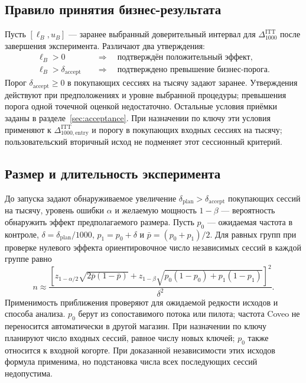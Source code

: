 \documentclass[12pt,a4paper]{article}
\theoremstyle{plainru}
\begin{document}
\subsection{Правило принятия бизнес-результата}\label{sec:eval-acceptance}

Пусть $[\ell_B,u_B]$ --- заранее выбранный доверительный интервал
для $\Delta_{1000}^{\mathrm{ITT}}$ после завершения эксперимента.
Различают два утверждения:
\begin{align}
 \ell_B>0
 &\quad\Longrightarrow\quad
 \text{подтверждён положительный эффект},
 \label{eq:eval-positive-acceptance}\\
 \ell_B>\delta_{\mathrm{accept}}
 &\quad\Longrightarrow\quad
 \text{подтверждено превышение бизнес-порога}.
 \label{eq:eval-business-acceptance}
\end{align}
Порог $\delta_{\mathrm{accept}}\ge0$ в покупающих сессиях на тысячу
задают заранее. Утверждения действуют при предположениях и уровне
выбранной процедуры; превышения порога одной точечной оценкой недостаточно.
Остальные условия приёмки заданы в разделе~\ref{sec:acceptance}.
При назначении по ключу эти условия применяют к
$\Delta_{1000,\mathrm{entry}}^{\mathrm{ITT}}$ и порогу в покупающих
входных сессиях на тысячу; пользовательский вторичный исход
не подменяет этот сессионный критерий.

\subsection{Размер и длительность эксперимента}\label{sec:eval-power}

До запуска задают обнаруживаемое увеличение
$\delta_{\mathrm{plan}}>\delta_{\mathrm{accept}}$ покупающих сессий на тысячу, уровень ошибки $\alpha$
и желаемую мощность $1-\beta$ --- вероятность обнаружить эффект
предполагаемого размера. Пусть $p_0$ --- ожидаемая частота в контроле,
$\delta=\delta_{\mathrm{plan}}/1000$, $p_1=p_0+\delta$ и
$\bar p=(p_0+p_1)/2$.
Для равных групп при проверке нулевого эффекта ориентировочное число
независимых сессий в каждой группе равно
\begin{equation}\label{eq:eval-sample-size}
 n\approx\frac{
 \left[z_{1-\alpha/2}\sqrt{2\bar p(1-\bar p)}
       +z_{1-\beta}\sqrt{p_0(1-p_0)+p_1(1-p_1)}\right]^2}
 {\delta^2}.
\end{equation}
Применимость приближения проверяют для ожидаемой редкости исходов
и способа анализа. $p_0$ берут из сопоставимого потока или пилота;
частота Coveo не переносится автоматически в другой магазин.
При назначении по ключу планируют число входных сессий, равное числу
новых ключей; $p_0$ также относится к входной когорте. При доказанной
независимости этих исходов формула применима, но подстановка числа
всех последующих сессий недопустима.
\end{document}
